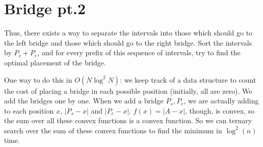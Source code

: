 \documentclass[a4paper]{article}
\begin{document}
\section{Bridge pt.2 }
Thus, there exists a way to separate the intervals into those which should
go to the left bridge and those which should go to the right bridge.
Sort the intervals by $P_s + P_e$, and for every prefix of this sequence
of intervals, try to find the optimal placement of the bridge.

One way to do this in $O(N \log^2 N)$: we keep track of a data structure
to count the cost of placing a bridge in each possible position (initially,
all are zero). We add the bridges one by one. When we add a bridge $P_s, P_e$,
we are actually adding to each position $x$, $|P_s - x|$ and $|P_e - x|$.
$f(x) = |A - x|$, though, is convex, so the sum over all these convex
functions is a convex function. So we can ternary search over the sum of
these convex functions to find the minimum in $\log^2 (n)$ time.
\end{document}
